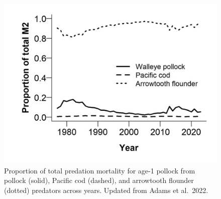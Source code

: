 \documentclass[
]{article}
\begin{document}
\begin{figure}
\centering
\includegraphics{Results/ESR_Fig3.jpg}
\caption{Proportion of total predation mortality for age-1 pollock from
pollock (solid), Pacific cod (dashed), and arrowtooth flounder (dotted)
predators across years. Updated from Adams et al.~2022.}
\end{figure}
\end{document}
